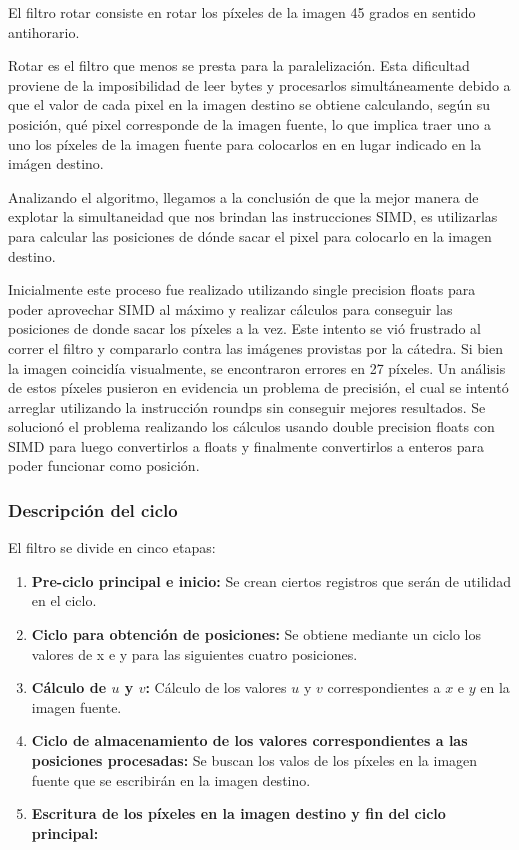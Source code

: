 El filtro rotar consiste en rotar los píxeles de la imagen 45 grados en sentido antihorario.

Rotar es el filtro que menos se presta para la paralelización. Esta dificultad proviene de la imposibilidad de leer bytes y procesarlos simultáneamente debido a que el valor de cada pixel en la imagen destino se obtiene calculando, según su posición, qué pixel corresponde de la imagen fuente, lo que implica traer uno a uno los píxeles de la imagen fuente para colocarlos en en lugar indicado en la imágen destino.

Analizando el algoritmo, llegamos a la conclusión de que la mejor manera de explotar la simultaneidad que nos brindan las instrucciones SIMD, es utilizarlas para calcular las posiciones de dónde sacar el pixel para colocarlo en la imagen destino. 

Inicialmente este proceso fue realizado utilizando single precision floats para poder aprovechar SIMD al máximo y realizar cálculos para conseguir las posiciones de donde sacar los píxeles a la vez. Este intento se vió frustrado al correr el filtro y compararlo contra las imágenes provistas por la cátedra. Si bien la imagen coincidía visualmente, se encontraron errores en 27 píxeles. Un análisis de estos píxeles pusieron en evidencia un problema de precisión, el cual se intentó arreglar utilizando la instrucción roundps sin conseguir mejores resultados. Se solucionó el problema realizando los cálculos usando double precision floats con SIMD para luego convertirlos a floats y finalmente convertirlos a enteros para poder funcionar como posición.


\subsubsection{Descripción del ciclo}

El filtro se divide en cinco etapas:

\begin{enumerate}
\item \textbf{Pre-ciclo principal e inicio:} Se crean ciertos registros que serán de utilidad en el ciclo.
\item \textbf{Ciclo para obtención de posiciones:} Se obtiene mediante un ciclo los valores de x e y para las siguientes cuatro posiciones.
\item \textbf{Cálculo de $u$ y $v$:} Cálculo de los valores $u$ y $v$ correspondientes a $x$ e $y$ en la imagen fuente.
\item \textbf{Ciclo de almacenamiento de los valores correspondientes a las posiciones procesadas:} Se buscan los valos de los píxeles en la imagen fuente que se escribirán en la imagen destino.
\item \textbf{Escritura de los píxeles en la imagen destino y fin del ciclo principal:}
\end{enumerate}


